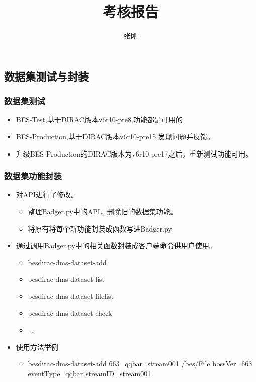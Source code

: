 \documentclass{beamer}
\title{考核报告}
\author{张刚}
\institute{}
\begin{document}
\begin{CJK*}{UTF8}{}

\maketitle


\section{数据集测试与封装}
\begin{frame}
  \frametitle{数据集测试}
  \begin{itemize}
    \item BES-Test,基于DIRAC版本v6r10-pre8,功能都是可用的 
    \item BES-Production,基于DIRAC版本v6r10-pre15,发现问题并反馈。
    \item 升级BES-Production的DIRAC版本为v6r10-pre17之后，重新测试功能可用。 
  \end{itemize}
\end{frame}
\begin{frame}
  \frametitle{数据集功能封装}
  \begin{itemize}
    \item 对API进行了修改。
    \begin{itemize}
      \item 整理Badger.py中的API，删除旧的数据集功能。
      \item 将原有将每个新功能封装成函数写进Badger.py
    \end{itemize}
    \item 通过调用Badger.py中的相关函数封装成客户端命令供用户使用。
      \begin{itemize}
        \item besdirac-dms-dataset-add
        \item besdirac-dms-dataset-list
        \item besdirac-dms-dataset-filelist
        \item besdirac-dms-dataset-check 
        \item ...
      \end{itemize}
    \item 使用方法举例
      \begin{itemize}
        \item besdirac-dms-dataset-add 663\_qqbar\_stream001 /bes/File bossVer=663 eventType=qqbar streamID=stream001

\end{itemize}
\end{itemize}
\end{frame}
\end{CJK*}
\end{document}
